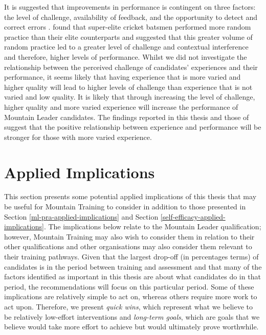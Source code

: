 \documentclass[
  12pt,
  a4paper,
]{book}
\begin{document}
It is suggested that improvements in performance is contingent on three factors: the level of challenge, availability of feedback, and the opportunity to detect and correct errors \citep{Ericsson1993, Guadagnoll2004}. \citet{Jones2020} found that super-elite cricket batsmen performed more random practice than their elite counterparts and suggested that this greater volume of random practice led to a greater level of challenge and contextual interference and therefore, higher levels of performance. Whilst we did not investigate the relationship between the perceived challenge of candidates' experiences and their performance, it seems likely that having experience that is more varied and higher quality will lead to higher levels of challenge than experience that is not varied and low quality. It is likely that through increasing the level of challenge, higher quality and more varied experience will increase the performance of Mountain Leader candidates. The findings reported in this thesis and those of \citet{Jones2020} suggest that the positive relationship between experience and performance will be stronger for those with more varied experience.

\hypertarget{gen-discussion-applied-implications}{%
\section{Applied Implications}\label{gen-discussion-applied-implications}}

This section presents some potential applied implications of this thesis that may be useful for Mountain Training to consider in addition to those presented in Section \ref{ml-pra-applied-implications} and Section \ref{self-efficacy-applied-implications}. The implications below relate to the Mountain Leader qualification; however, Mountain Training may also wish to consider them in relation to their other qualifications and other organisations may also consider them relevant to their training pathways. Given that the largest drop-off (in percentages terms) of candidates is in the period between training and assessment and that many of the factors identified as important in this thesis are about what candidates do in that period, the recommendations will focus on this particular period. Some of these implications are relatively simple to act on, whereas others require more work to act upon. Therefore, we present \emph{quick wins}, which represent what we believe to be relatively low-effort interventions and \emph{long-term goals}, which are goals that we believe would take more effort to achieve but would ultimately prove worthwhile.
\end{document}
